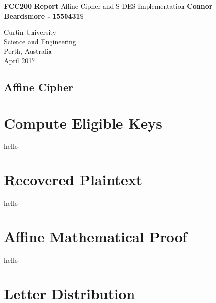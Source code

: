 \documentclass[]{article}
\begin{document}

\begin{titlepage}
	\begin{center}
		\vspace*{1cm}
		\LARGE\textbf{FCC200 Report}
		\break
		Affine Cipher and S-DES Implementation
		\vspace{1cm}
		\break
		\Large\textbf{Connor Beardsmore - 15504319} 
		\vspace{15cm}

		\normalsize
		Curtin University \\
		Science and Engineering \\
		Perth, Australia \\
	    April 2017
	    
	\end{center}
\end{titlepage}


\vspace*{-0.8cm}
\begin{center}
	\section*{Affine Cipher}
\end{center}

\vspace*{0.8cm}
\section*{Compute Eligible Keys}

hello

\section*{Recovered Plaintext}

hello

\section*{Affine Mathematical Proof}

hello

\section*{Letter Distribution}
\end{document}
